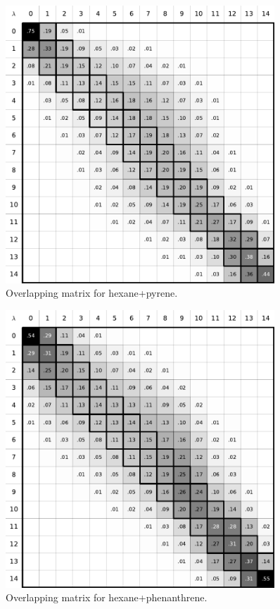 \documentclass[
	12pt,				%
	openany,			%
	oneside,			%
	a4paper,			%
	english,			%
	brazil				%
	]{abntex2}
\begin{document}
\begin{apendicesenv}
\begin{figure}[H]
	\centering
	\includegraphics[width=0.9\textwidth]{Figures/ohex_pyr}
	\caption{Overlapping matrix for hexane+pyrene.}
\end{figure}

\begin{figure}[H]
	\centering
	\includegraphics[width=0.9\textwidth]{Figures/ohex_phen}
	\caption{Overlapping matrix for hexane+phenanthrene.}
\end{figure}


\end{apendicesenv}
\end{document}
